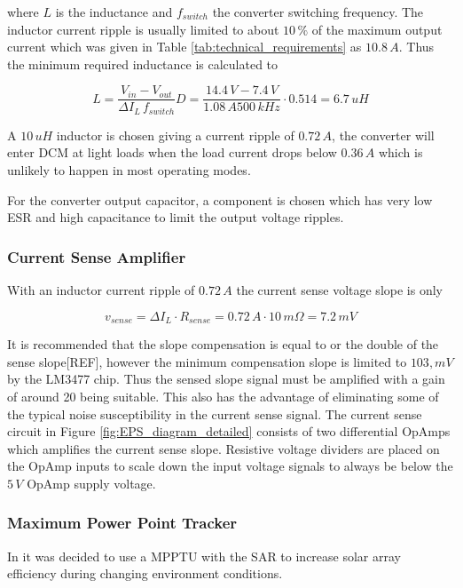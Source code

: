 where $L$ is the inductance and $f_{switch}$ the converter switching frequency. The inductor current ripple is usually limited to about $10\,\%$ of the maximum output current which was given in Table \ref{tab:technical_requirements} as $10.8\,A$. Thus the minimum required inductance is calculated to

\begin{equation}
L=\dfrac{V_{in}-V_{out}}{\Delta I_L\,f_{switch}}D=\dfrac{14.4\,V-7.4\,V}{1.08\,A 500\,kHz}\cdot 0.514=6.7\,uH
\end{equation}

A $10\,uH$ inductor is chosen giving a current ripple of $0.72\,A$, the converter will enter \ac{DCM} at light loads when the load current drops below $0.36\,A$ which is unlikely to happen in most operating modes.

For the converter output capacitor, a component is chosen which has very low \ac{ESR} and high capacitance to limit the output voltage ripples.

\subsubsection*{Current Sense Amplifier}
With an inductor current ripple of $0.72\,A$ the current sense voltage slope is only 

\begin{equation}
v_{sense}=\Delta I_L\cdot R_{sense}=0.72\,A\cdot 10\,m\Omega = 7.2\,mV
\end{equation}

It is recommended that the slope compensation is equal to or the double of the sense slope[REF], however the minimum compensation slope is limited to $103,mV$ by the LM3477 chip. Thus the sensed slope signal must be amplified with a gain of around 20 being suitable. This also has the advantage of eliminating some of the typical noise susceptibility in the current sense signal. The current sense circuit in Figure \ref{fig:EPS_diagram_detailed} consists of two differential OpAmps which amplifies the current sense slope. Resistive voltage dividers are placed on the OpAmp inputs to scale down the input voltage signals to always be below the $5\,V$ OpAmp supply voltage.

\subsubsection{Maximum Power Point Tracker}
In \cite{PDR} it was decided to use a \ac{MPPTU} with the \ac{SAR} to increase solar array efficiency during changing environment conditions.


